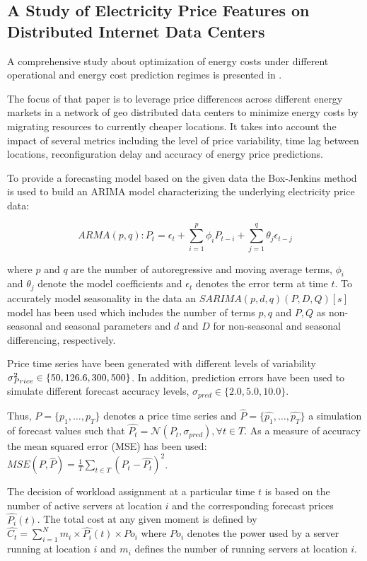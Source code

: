 \subsection{A Study of Electricity Price Features on Distributed Internet Data Centers}

A comprehensive study about optimization of energy costs under different operational and energy cost prediction regimes is presented in \cite{de2013study}. 

The focus of that paper is to leverage price differences across different energy markets in a network of geo distributed data centers to minimize energy costs by migrating resources to currently cheaper locations. It takes into account the impact of several metrics including the level of price variability, time lag between locations, reconfiguration delay and accuracy of energy price predictions. 

To provide a forecasting model based on the given data the Box-Jenkins method is used to build an ARIMA model characterizing the underlying electricity price data:

\[ ARMA(p,q) : P_t = \epsilon_t + \sum_{i=1}^{p}{\phi_i P_{t-i}} + \sum_{j=1}^{q}{\theta_j \epsilon_{t-j}}\] 

where $p$ and $q$ are the number of autoregressive and moving average terms, $\phi_i$ and $\theta_j$ denote the model coefficients and $\epsilon_t$ denotes the error term at time $t$. To accurately model seasonality in the data an $SARIMA(p,d,q)(P,D,Q)[s]$ model has been used which includes the number of terms $p,q$ and $P,Q$ as non-seasonal and seasonal parameters and $d$ and $D$ for non-seasonal and seasonal differencing, respectively. 

Price time series have been generated with different levels of variability $\sigma_{Price}^{2} \in \{50, 126.6, \allowbreak 300, 500\}$. In addition, prediction errors have been used to simulate different forecast accuracy levels, $\sigma_{pred} \in \{2.0, 5.0, 10.0\}$. 

Thus, $P = \{p_1,\ldots,p_T \}$ denotes a price time series and $\hat{P} = \{\hat{p_1},\ldots,\hat{p_T}\}$ a simulation of forecast values such that 
$\hat{P_t} = \mathcal{N}(P_t, \sigma_{pred}), \forall t \in T$. As a measure of accuracy the mean squared error (MSE) has been used: 
$MSE(P,\hat{P}) = \frac{1}{T} \sum_{t \in T}{(P_t - \hat{P_t})^2}$. 

The decision of workload assignment at a particular time $t$ is based on the number of active servers at location $i$ and the corresponding forecast prices $\hat{P_i}(t)$. The total cost at any given moment is defined by $\hat{C_t} = \sum_{i=1}^{N}{m_i \times \hat{P_i}(t) \times Po_i}$ where $Po_i$ denotes the power used by a server running at location $i$ and $m_i$ defines the number of running servers at location $i$. 

